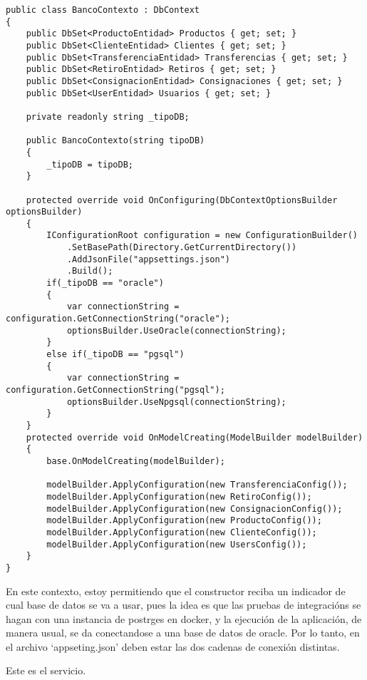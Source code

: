 \documentclass[executivepaper]{article}
\begin{document}
\begin{lstlisting}
public class BancoContexto : DbContext
{
    public DbSet<ProductoEntidad> Productos { get; set; }
    public DbSet<ClienteEntidad> Clientes { get; set; }
    public DbSet<TransferenciaEntidad> Transferencias { get; set; }
    public DbSet<RetiroEntidad> Retiros { get; set; }
    public DbSet<ConsignacionEntidad> Consignaciones { get; set; }
    public DbSet<UserEntidad> Usuarios { get; set; }

    private readonly string _tipoDB;

    public BancoContexto(string tipoDB)
    {
        _tipoDB = tipoDB;
    }

    protected override void OnConfiguring(DbContextOptionsBuilder optionsBuilder)
    {
        IConfigurationRoot configuration = new ConfigurationBuilder()
            .SetBasePath(Directory.GetCurrentDirectory())
            .AddJsonFile("appsettings.json")
            .Build();
        if(_tipoDB == "oracle")
        {
            var connectionString = configuration.GetConnectionString("oracle");
            optionsBuilder.UseOracle(connectionString);
        }
        else if(_tipoDB == "pgsql")
        {
            var connectionString = configuration.GetConnectionString("pgsql");
            optionsBuilder.UseNpgsql(connectionString);
        }
    }
    protected override void OnModelCreating(ModelBuilder modelBuilder)
    {
        base.OnModelCreating(modelBuilder);

        modelBuilder.ApplyConfiguration(new TransferenciaConfig());
        modelBuilder.ApplyConfiguration(new RetiroConfig());
        modelBuilder.ApplyConfiguration(new ConsignacionConfig());
        modelBuilder.ApplyConfiguration(new ProductoConfig());
        modelBuilder.ApplyConfiguration(new ClienteConfig());
        modelBuilder.ApplyConfiguration(new UsersConfig());
    }
}
\end{lstlisting}

En este contexto, estoy permitiendo que el constructor reciba un indicador de cual base de datos se va a usar, pues la idea es que las pruebas de integracións se hagan con una instancia de postrges en docker, y la ejecución de la aplicación, de manera usual, se da conectandose a una base de datos de oracle. Por lo tanto, en el archivo \enquote*{appseting.json} deben estar las dos cadenas de conexión distintas.

Este es el servicio.
\end{document}
